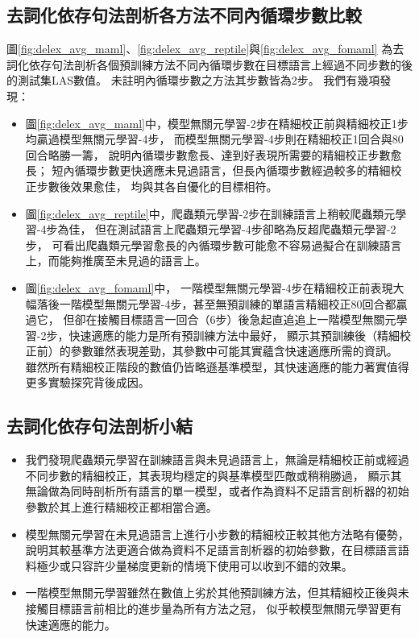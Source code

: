 \subsection{去詞化依存句法剖析各方法不同內循環步數比較}

圖\ref{fig:delex_avg_maml}、\ref{fig:delex_avg_reptile}與\ref{fig:delex_avg_fomaml}
為去詞化依存句法剖析各個預訓練方法不同內循環步數在目標語言上經過不同步數的\finetune 後的測試集LAS數值。
未註明內循環步數之方法其步數皆為2步。
我們有幾項發現：
\begin{itemize}
    \item 圖\ref{fig:delex_avg_maml}中，模型無關元學習-2步在精細校正前與精細校正1步均贏過模型無關元學習-4步，
    而模型無關元學習-4步則在精細校正1回合與80回合略勝一籌，
    說明內循環步數愈長、達到好表現所需要的精細校正步數愈長；
    短內循環步數更快適應未見過語言，但長內循環步數經過較多的精細校正步數後效果愈佳，
    均與其各自優化的目標相符。
    \item 圖\ref{fig:delex_avg_reptile}中，爬蟲類元學習-2步在訓練語言上稍較爬蟲類元學習-4步為佳，
    但在測試語言上爬蟲類元學習-4步卻略為反超爬蟲類元學習-2步，
    可看出爬蟲類元學習愈長的內循環步數可能愈不容易過擬合在訓練語言上，而能夠推廣至未見過的語言上。
    \item 圖\ref{fig:delex_avg_fomaml}中，
一階模型無關元學習-4步在精細校正前表現大幅落後一階模型無關元學習-4步，甚至無預訓練的單語言精細校正80回合都贏過它，
但卻在接觸目標語言一回合（6步）後急起直追追上一階模型無關元學習-2步，快速適應的能力是所有預訓練方法中最好，
顯示其預訓練後（精細校正前）的參數雖然表現差勁，其參數中可能其實蘊含快速適應所需的資訊。
雖然所有精細校正階段的數值仍皆略遜基準模型，其快速適應的能力著實值得更多實驗探究背後成因。
\end{itemize}
\subsection{去詞化依存句法剖析小結}
\begin{itemize}
    \item 我們發現爬蟲類元學習在訓練語言與未見過語言上，無論是精細校正前或經過不同步數的精細校正，其表現均穩定的與基準模型匹敵或稍稍勝過，
顯示其無論做為同時剖析所有語言的單一模型，或者作為資料不足語言剖析器的初始參數於其上進行精細校正都相當合適。
    \item 模型無關元學習在未見過語言上進行小步數的精細校正較其他方法略有優勢，
說明其較基準方法更適合做為資料不足語言剖析器的初始參數，在目標語言語料極少或只容許少量梯度更新的情境下使用可以收到不錯的效果。
    \item 一階模型無關元學習雖然在數值上劣於其他預訓練方法，但其精細校正後與未接觸目標語言前相比的進步量為所有方法之冠，
似乎較模型無關元學習更有快速適應的能力。
\end{itemize}
